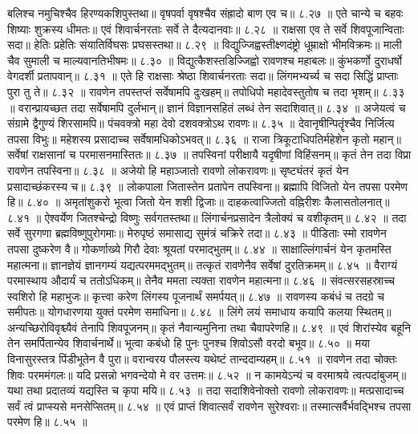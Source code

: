 बलिश्च नमुचिश्चैव हिरण्यकशिपुस्तथा॥
वृषपर्वा वृषश्चैव संह्रादो बाण एव च॥ ८.२७ ॥
एते चान्ये च बहवः शिष्याः शुक्रस्य धीमतः॥
एवं शिवार्चनरताः सर्वे ते दैत्यदानवाः॥ ८.२८ ॥
राक्षसा एव ते सर्वे शिवपूजान्विताः सदा॥
हेतिः प्रहेतिः संयातिर्विघसः प्रघसस्तथा॥ ८.२९ ॥
विद्युज्जिह्वस्तीक्ष्णदंष्ट्रो धूम्राक्षो भीमविक्रमः॥
माली चैव सुमाली च माल्यवानतिभीषमः॥ ८.३० ॥
विद्युत्कैशस्तडिज्जिह्वो रावणश्च महाबलः॥
कुंभकर्णो दुराधर्षो वेगदर्शी प्रतापवान्॥ ८.३१ ॥
एते हि राक्षसाः श्रेष्ठा शिवार्चनरताः सदा॥
लिंगमभ्यर्च्य च सदा सिद्धिं प्राप्ताः पुरा तु ते॥ ८.३२ ॥
रावणेन तपस्तप्तं सर्वेषामपि दुःखहम्॥
तपोधिपो महादेवस्तुतोष च तदा भृशम्॥ ८.३३ ॥
वरान्प्रायच्छत तदा सर्वेषामपि दुर्लभान्॥
ज्ञानं विज्ञानसहितं लब्धं तेन सदाशिवात्॥ ८.३४ ॥
अजेयत्वं च संग्रामे द्वैगुण्यं शिरसामपि॥
पंचवक्त्रो महा देवो दशवक्त्रोऽथ रावणः॥ ८.३५ ॥
देवानृषीन्पितॄंश्चैव निर्जित्य तपसा विभुः॥
महेशस्य प्रसादाच्च सर्वेषामधिकोऽभवत्॥ ८.३६ ॥
राजा त्रिकूटाधिपतिर्महेशेन कृतो महान्॥
सर्वेषां राक्षसानां च परमासनमास्तितः॥ ८.३७ ॥
तपस्विनां परीक्षायै यदृषीणां विहिंसनम्॥
कृतं तेन तदा विप्रा रावणेन तपस्विना॥ ८.३८ ॥
अजेयो हि महाञ्जातो रावणो लोकरावणः॥
सृष्ट्यंतरं कृतं येन प्रसादाच्छंकरस्य च॥ ८.३९ ॥
लोकपाला जितास्तेन प्रतापेन तपस्विना॥
ब्रह्मापि विजितो येन तपसा परमेण हि॥ ८.४० ॥
अमृतांशुकरो भूत्वा जितो येन शशी द्विजाः॥
दाहकत्वाज्जितो वह्निरीशः कैलासतोलनात्॥ ८.४१ ॥
ऐश्वर्येण जितश्चेन्द्रो विष्णुः सर्वगतस्तथा॥
लिंगार्चनप्रसादेन त्रैलोक्यं च वशीकृतम्॥ ८.४२ ॥
तदा सर्वे सुरगणा ब्रह्मविष्णुपुरोगमाः॥
मेरुपृष्ठं समासाद्य सुमंत्रं चक्रिरे तदा॥ ८.४३ ॥
पीडिताः स्मो रावणेन तपसा दुष्करेण वै॥
गोकर्णाख्ये गिरौ देवाः श्रूयतां परमाद्भुतम्॥ ८.४४ ॥
साक्षाल्लिंगार्चनं येन कृतमस्ति महात्मना॥
ज्ञानज्ञेयं ज्ञानगम्यं यद्यत्परममद्भुतम्॥
तत्कृतं रावणेनैव सर्वेषां दुरतिक्रमम्॥ ८.४५ ॥
वैराग्यं परमास्थाय औदार्यं च ततोऽधिकम्॥
तेनैव ममता त्यक्ता रावणेन महात्मना॥ ८.४६ ॥
संवत्सरसहस्राच्च स्वशिरो हि महाभुजः॥
कृत्त्वा करेण लिंगस्य पूजनार्थं समर्पयत्॥ ८.४७ ॥
रावणस्य कबंधं च तदग्रे च समीपतः॥
योगधारणया युक्तं परमेण समाधिना॥ ८.४८ ॥
लिंगे लयं समाधाय कयापि कलया स्थितम्॥
अन्यच्छिरोविवृश्च्यैवं तेनापि शिवपूजनम्॥
कृतं नैवान्यमुनिना तथा चैवापरेणहि॥ ८.४९ ॥
एवं शिरांस्येव बहूनि तेन समर्पितान्येव शिवार्चनार्थे॥
भूत्वा कबंधो हि पुनः पुनश्च शिवोऽसौ वरदो बभूव॥ ८.५० ॥
मया विनासुरस्तत्र पिंडीभूतेन वै पुरा॥
वरान्वरय पौलस्त्य यथेष्टं तान्ददाम्यहम्॥ ८.५१ ॥
रावणेन तदा चोक्तः शिवः परममंगलः॥
यदि प्रसन्नो भगवन्देयो मे वर उत्तमः॥ ८.५२ ॥
न कामयेऽन्यं च वरमाश्रये त्वत्पदांबुजम्॥
यथा तथा प्रदातव्यं यद्यस्ति च कृपा मयि॥ ८.५३ ॥
तदा सदाशिवेनोक्तो रावणो लोकरावणः॥
मत्प्रसादाच्च सर्वं त्वं प्राप्स्यसे मनसेप्सितम्॥ ८.५४ ॥
एवं प्राप्तं शिवात्सर्वं रावणेन सुरेश्वराः॥
तस्मात्सर्वैर्भवद्भिश्च तपसा परमेण हि॥ ८.५५ ॥
